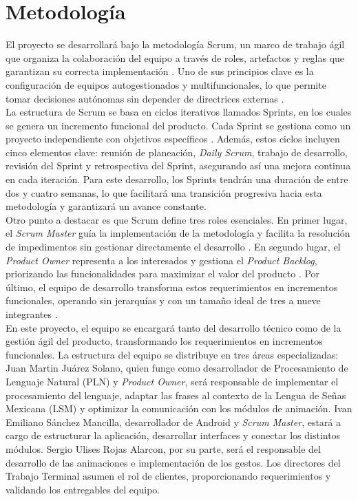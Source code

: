 \newpage
\section{Metodología}
El proyecto se desarrollará bajo la metodología Scrum, un marco de trabajo ágil que organiza la colaboración del equipo a través de roles, artefactos y reglas que garantizan su correcta implementación \cite{ref16}\cite{ref17}. Uno de sus principios clave es la configuración de equipos autogestionados y multifuncionales, lo que permite tomar decisiones autónomas sin depender de directrices externas \cite{ref17}.\\

La estructura de Scrum se basa en ciclos iterativos llamados Sprints, en los cuales se genera un incremento funcional del producto. Cada Sprint se gestiona como un proyecto independiente con objetivos específicos \cite{ref17}. Además, estos ciclos incluyen cinco elementos clave: reunión de planeación, \textit{Daily Scrum}, trabajo de desarrollo, revisión del Sprint y retrospectiva del Sprint, asegurando así una mejora continua en cada iteración. Para este desarrollo, los Sprints tendrán una duración de entre dos y cuatro semanas, lo que facilitará una transición progresiva hacia esta metodología y garantizará un avance constante.\\

Otro punto a destacar es que Scrum define tres roles esenciales. En primer lugar, el \textit{Scrum Master} guía la implementación de la metodología y facilita la resolución de impedimentos sin gestionar directamente el desarrollo \cite{ref18}. En segundo lugar, el \textit{Product Owner} representa a los interesados y gestiona el \textit{Product Backlog}, priorizando las funcionalidades para maximizar el valor del producto \cite{ref18}. Por último, el equipo de desarrollo transforma estos requerimientos en incrementos funcionales, operando sin jerarquías y con un tamaño ideal de tres a nueve integrantes \cite{ref18}.\\

En este proyecto, el equipo se encargará tanto del desarrollo técnico como de la gestión ágil del producto, transformando los requerimientos en incrementos funcionales. La estructura del equipo se distribuye en tres áreas especializadas: Juan Martin Juárez Solano, quien funge como desarrollador de Procesamiento de Lenguaje Natural (PLN) y \textit{Product Owner}, será responsable de implementar el procesamiento del lenguaje, adaptar las frases al contexto de la Lengua de Señas Mexicana (LSM) y optimizar la comunicación con los módulos de animación. Ivan Emiliano Sánchez Mancilla, desarrollador de Android y \textit{Scrum Master}, estará a cargo de estructurar la aplicación, desarrollar interfaces y conectar los distintos módulos. Sergio Ulises Rojas Alarcon, por su parte, será el responsable del desarrollo de las animaciones e implementación de los gestos. Los directores del Trabajo Terminal asumen el rol de clientes, proporcionando requerimientos y validando los entregables del equipo.\\

